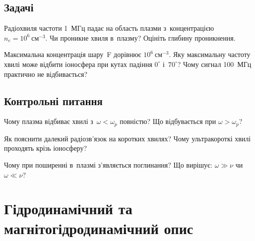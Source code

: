 \section*{Задачі}

\begin{problem}\label{prb:PlasmaWave}
	Радіохвиля частоти 1~МГц падає на область плазми з~концентрацією
	$n_e=10^6~\mathrm{см}^{-3}$. Чи проникне хвиля в~плазму? Оцініть глибину проникнення.
\end{problem}

\begin{problem}\label{prb:PlasmaIonosphere}
	Максимальна концентрація шару~F дорівнює $10^6~\mathrm{см}^{-3}$. Яку максимальну
	частоту хвилі може відбити іоносфера при кутах падіння $0^\circ$ і~$70^\circ$? Чому
	сигнал 100~МГц практично не відбивається?
\end{problem}

\section*{Контрольні питання}

\begin{Questions}
\begin{quizlist}
\item Чому плазма відбиває хвилі з~$\omega<\omega_p$ повністю? Що відбувається при
		  $\omega>\omega_p$?

\item Як пояснити далекий радіозв'язок на коротких хвилях? Чому ультракороткі
		  хвилі проходять крізь іоносферу?

\item Чому при поширенні в~плазмі з'являється поглинання? Що вирішує:
		  $\omega\gg\nu$ чи $\omega\ll\nu$?

\end{quizlist}
\end{Questions}

\chapter{Гідродинамічний та магнітогідродинамічний опис}



\label{sec:mhd}\hypertarget{mhd}{}

